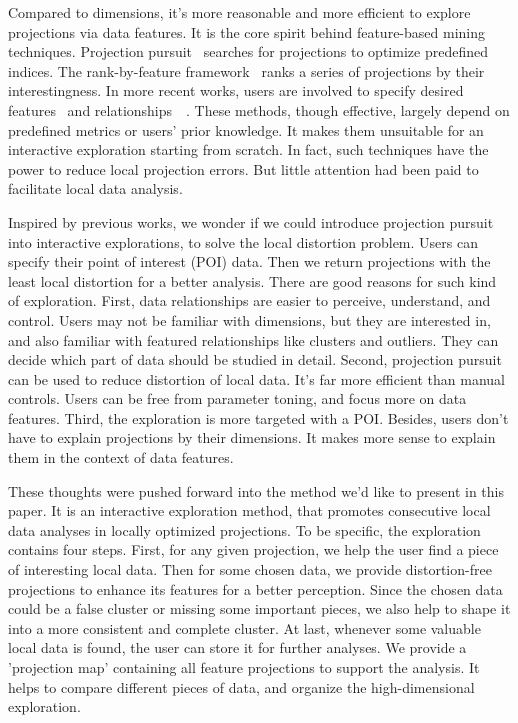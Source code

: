 Compared to dimensions, it's more reasonable and more efficient to explore projections via data features. It is the core spirit behind feature-based mining techniques. Projection pursuit~\cite{DBLP:journals/tc/FriedmanT74} searches for projections to optimize predefined indices. The rank-by-feature framework~\cite{DBLP:journals/ivs/SeoS05} ranks a series of projections by their interestingness. In more recent works, users are involved to specify desired features~\cite{DBLP:journals/tvcg/JohanssonJ09} and relationships~\cite{DBLP:journals/tvcg/HuBMHNL13}~\cite{DBLP:journals/tvcg/Gleicher13}. These methods, though effective, largely depend on predefined metrics or users' prior knowledge. It makes them unsuitable for an interactive exploration starting from scratch. In fact, such techniques have the power to reduce local projection errors. But little attention had been paid to facilitate local data analysis.

Inspired by previous works, we wonder if we could introduce projection pursuit into interactive explorations, to solve the local distortion problem. Users can specify their point of interest (POI) data. Then we return projections with the least local distortion for a better analysis. There are good reasons for such kind of exploration. First, data relationships are easier to perceive, understand, and control. Users may not be familiar with dimensions, but they are interested in, and also familiar with featured relationships like clusters and outliers. They can decide which part of data should be studied in detail. Second, projection pursuit can be used to reduce distortion of local data. It's far more efficient than manual controls. Users can be free from parameter toning, and focus more on data features. Third, the exploration is more targeted with a POI. Besides, users don't have to explain projections by their dimensions. It makes more sense to explain them in the context of data features.

These thoughts were pushed forward into the method we'd like to present in this paper. It is an interactive exploration method, that promotes consecutive local data analyses in locally optimized projections. To be specific, the exploration contains four steps. First, for any given projection, we help the user find a piece of interesting local data. Then for some chosen data, we provide distortion-free projections to enhance its features for a better perception. Since the chosen data could be a false cluster or missing some important pieces, we also help to shape it into a more consistent and complete cluster. At last, whenever some valuable local data is found, the user can store it for further analyses. We provide a 'projection map' containing all feature projections to support the analysis. It helps to compare different pieces of data, and organize the high-dimensional exploration.

